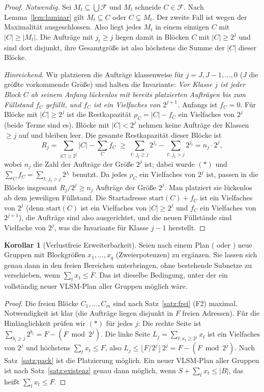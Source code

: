 \documentclass[a4paper,12pt, twoside]{report}
\theoremstyle{definition}
\newtheorem{korollar}{Korollar}
\newcommand{\code}[1]{\texttt{\detokenize{#1}}}
\begin{document}
\begin{proof}
	\emph{Notwendig.} Sei $M_t \subseteq \bigcup\mathcal{F}$ und $M_t$ schneide $C \in \mathcal{F}$. Nach Lemma~\ref{lem:laminar} gilt $M_t \subseteq C$ oder $C \subsetneq M_t$. Der zweite Fall ist wegen der Maximalität ausgeschlossen. Also liegt jedes $M_t$ in einem einzigen $C$ mit $|C| \ge |M_t|$. Die Aufträge mit $j_t\ge j$ liegen damit in Blöcken $C$ mit $|C|\ge 2^j$ und sind dort disjunkt, ihre Gesamtgröße ist also höchstens die Summe der $|C|$ dieser Blöcke.

	\emph{Hinreichend.} Wir platzieren die Aufträge klassenweise für $j = J, J-1,\ldots,0$ ($J$ die größte vorkommende Größe) und halten die Invariante: \emph{Vor Klasse $j$ ist jeder Block $C$ ab seinem Anfang lückenlos mit bereits platzierten Aufträgen bis zum Füllstand $f_C$ gefüllt, und $f_C$ ist ein Vielfaches von $2^{j+1}$.} Anfangs ist $f_C = 0$. Für Blöcke mit $|C| \ge 2^j$ ist die Restkapazität $\rho_C = |C| - f_C$ ein Vielfaches von $2^j$ (beide Terme sind es). Blöcke mit $|C| < 2^j$ nehmen keine Aufträge der Klassen $\ge j$ auf und bleiben leer. Die gesamte Restkapazität dieser Blöcke ist
	\[
	R_j = \sum_{|C|\ge 2^j}|C| - \sum_C f_C \;\ge\; \sum_{t:\ j_t\ge j}2^{j_t} - \sum_{t:\ j_t > j}2^{j_t} = n_j\cdot 2^j,
	\]
	wobei $n_j$ die Zahl der Aufträge der Größe $2^j$ ist; dabei wurde $(\ast)$ und $\sum_C f_C = \sum_{t:\,j_t>j}2^{j_t}$ benutzt. Da jedes $\rho_C$ ein Vielfaches von $2^j$ ist, passen in die Blöcke insgesamt $R_j/2^j \ge n_j$ Aufträge der Größe $2^j$. Man platziert sie lückenlos ab dem jeweiligen Füllstand. Die Startadresse $\mathrm{start}(C) + f_C$ ist ein Vielfaches von $2^j$ (denn $\mathrm{start}(C)$ ist ein Vielfaches von $|C| \ge 2^j$ und $f_C$ ein Vielfaches von $2^{j+1}$), die Aufträge sind also ausgerichtet, und die neuen Füllstände sind Vielfache von $2^j$, was die Invariante für Klasse $j-1$ herstellt.
\end{proof}

\begin{korollar}[Verlustfreie Erweiterbarkeit]
\label{kor:erweiterung}
	Seien nach einem Plan (\code{vlsm} oder \code{fixed}) neue Gruppen mit Blockgrößen $x_1,\ldots,x_q$ (Zweierpotenzen) zu ergänzen. Sie lassen sich genau dann in den freien Bereichen unterbringen, ohne bestehende Subnetze zu verschieben, wenn $\sum_t x_t \le F$. Das ist dieselbe Bedingung, unter der ein vollständig neuer VLSM-Plan aller Gruppen möglich wäre.
\end{korollar}

\begin{proof}
	Die freien Blöcke $C_1,\ldots,C_m$ sind nach Satz~\ref{satz:frei} (F2) maximal. Notwendigkeit ist klar (die Aufträge liegen disjunkt in $F$ freien Adressen). Für die Hinlänglichkeit prüfen wir $(\ast)$ für jedes $j$: Die rechte Seite ist $\sum_{b_i \ge j}2^{b_i} = F - (F \bmod 2^j)$. Die linke Seite $L_j = \sum_{t: x_t\ge 2^j} x_t$ ist ein Vielfaches von $2^j$ und höchstens $\sum_t x_t \le F$, also $L_j \le \lfloor F/2^j\rfloor\, 2^j = F - (F\bmod 2^j)$. Nach Satz~\ref{satz:pack} ist die Platzierung möglich. Ein neuer VLSM-Plan aller Gruppen ist nach Satz~\ref{satz:existenz} genau dann möglich, wenn $S + \sum_t x_t \le |B|$, das heißt $\sum_t x_t \le F$.
\end{proof}
\end{document}

